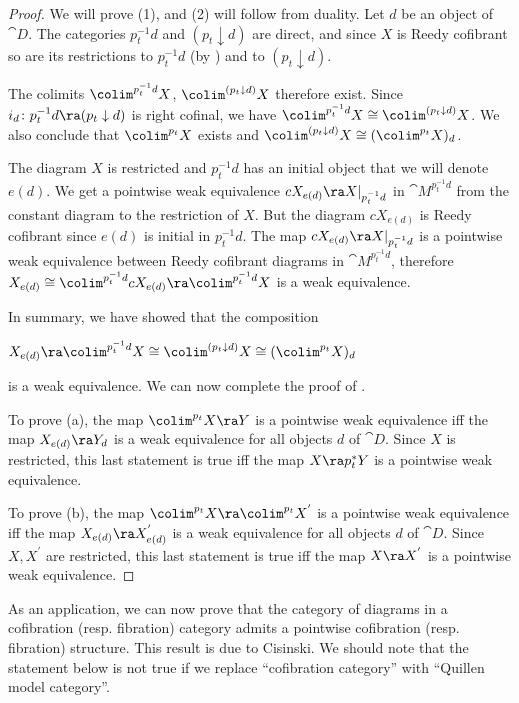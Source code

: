 \begin{proof}
We will prove (1), and (2) will follow from duality. Let $d$ be an object of ${\cat D}$. The categories $p_t^{-1}d$ and $(p_t \downarrow d)$ are direct, and since $X$ is Reedy cofibrant so are its restrictions to ${p_t^{-1}d}$ (by ) and to $(p_t \downarrow d)$.

The colimits $\colim^{p_t^{-1}d}X$, $\colim^{(p_t \downarrow d)} X$ therefore exist. Since $i_d \colon p_t^{-1}d \ra (p_t \downarrow d)$ is right cofinal, we have $\colim^{p_t^{-1}d}X \cong \colim^{(p_t \downarrow d)} X$. We also conclude that $\colim^{p_t} X$ exists and $\colim^{(p_t \downarrow d)} X \cong (\colim^{p_t} X)_d$.

The diagram $X$ is restricted and $p_t^{-1}d$ has an initial object that we will denote $e(d)$. We get a pointwise weak equivalence $cX_{e(d)} \ra X|_{p_t^{-1}d}$ in ${\cat M}^{p_t^{-1}d}$ from the constant diagram to the restriction of $X$. But the diagram $cX_{e(d)}$ is Reedy cofibrant since $e(d)$ is initial in $p_t^{-1}d$. The map $cX_{e(d)} \ra X|_{p_t^{-1}d}$ is a pointwise weak equivalence between Reedy cofibrant diagrams in ${\cat M}^{p_t^{-1}d}$, therefore $X_{e(d)} \cong \colim^{p_t^{-1}d}cX_{e(d)} \ra \colim^{p_t^{-1}d}X$ is a weak equivalence.

In summary, we have showed that the composition 
\begin{center}
$X_{e(d)} \ra \colim^{p_t^{-1}d}X \cong \colim^{(p_t \downarrow d)} X \cong (\colim^{p_t} X)_d$
\end{center}
is a weak equivalence. We can now complete the proof of .

To prove (a), the map $\colim^{p_t}X \ra Y$ is a pointwise weak equivalence iff the map $X_{e(d)} \ra Y_d$ is a weak equivalence for all objects $d$ of ${\cat D}$. Since $X$ is restricted, this last statement is true iff the map $X \ra p_t^*Y$ is a pointwise weak equivalence.

To prove (b), the map $\colim^{p_t}X \ra \colim^{p_t}X^{'}$ is a pointwise weak equivalence iff the map $X_{e(d)} \ra X^{'}_{e(d)}$ is a weak equivalence for all objects $d$ of ${\cat D}$. Since $X, X^{'}$ are restricted, this last statement is true iff the map $X \ra X^{'}$ is a pointwise weak equivalence.
\end{proof}

As an application, we can now prove that the category of diagrams in a cofibration (resp. fibration) category admits a pointwise cofibration (resp. fibration) structure. This result is due to Cisinski. We should note that the statement below is not true if we replace ``cofibration category'' with ``Quillen model category''.

